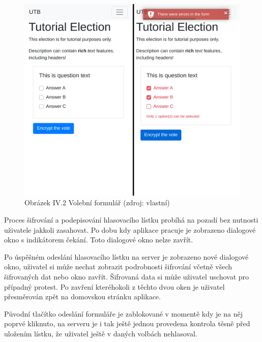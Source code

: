 \begin{figure}[h]
	\centering
	\includegraphics[width=\linewidth]{graphics/attachements/volbyCompared.png}
	\captionsetup{width=\linewidth}
	\caption*{Obrázek IV.2 Volební formulář (zdroj: vlastní)}
\end{figure}
\clearpage
Proces šifrování a podepisování hlasovacího lístku probíhá na pozadí bez nutnosti uživatele jakkoli zasahovat. Po dobu kdy aplikace pracuje je zobrazeno dialogové okno s indikátorem čekání. Toto dialogové okno nelze zavřít. 

Po úspěšném odeslání hlasovacího lístku na server je zobrazeno nové dialogové okno, uživatel si může nechat zobrazit podrobnosti šifrování včetně všech šifrovaných dat nebo okno zavřít. Šifrovaná data si může uživatel uschovat pro případný protest. Po zavření kteréhokoli z těchto dvou oken je uživatel přesměrován zpět na domovskou stránku aplikace. 

Původní tlačítko odeslání formuláře je zablokované v momentě kdy je na něj poprvé kliknuto, na serveru je i tak ještě jednou provedena kontrola těsně před uložením lístku, že uživatel ještě v daných volbách nehlasoval.

